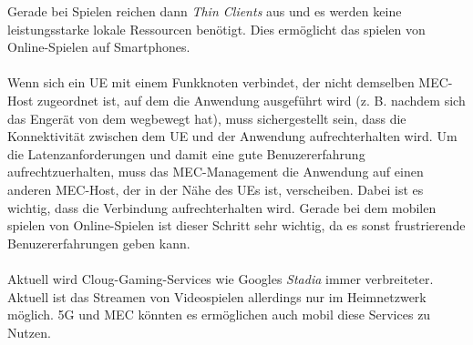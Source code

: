 \documentclass[runningheads]{llncs}
\numberwithin{figure}{section}
\begin{document}
Gerade bei Spielen reichen dann \textit{Thin Clients} aus und es werden keine leistungsstarke lokale Ressourcen benötigt. 
Dies ermöglicht das spielen von Online-Spielen auf Smartphones.
\\
\\
Wenn sich ein UE mit einem Funkknoten verbindet, der nicht demselben MEC-Host zugeordnet ist, 
auf dem die Anwendung ausgeführt wird (z. B. nachdem sich das Engerät von dem wegbewegt hat), 
muss sichergestellt sein, dass die Konnektivität zwischen dem UE und der Anwendung aufrechterhalten wird. 
Um die Latenzanforderungen und damit eine gute Benuzererfahrung aufrechtzuerhalten, 
muss das MEC-Management die Anwendung auf einen anderen MEC-Host, der in der Nähe des UEs ist, verscheiben. 
Dabei ist es wichtig, dass die Verbindung aufrechterhalten wird. Gerade bei dem mobilen spielen von Online-Spielen
ist dieser Schritt sehr wichtig, da es sonst frustrierende Benuzererfahrungen geben kann.
\\
\\
Aktuell wird Cloug-Gaming-Services wie Googles \textit{Stadia} immer verbreiteter. Aktuell ist das Streamen von Videospielen
allerdings nur im Heimnetzwerk möglich. 5G und MEC könnten es ermöglichen auch mobil diese Services zu Nutzen.
\end{document}
